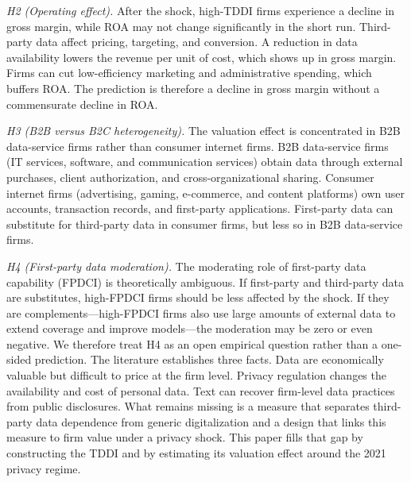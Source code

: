 \textit{H2 (Operating effect).} After the shock, high-TDDI firms experience a decline in gross margin, while ROA may not change significantly in the short run. Third-party data affect pricing, targeting, and conversion. A reduction in data availability lowers the revenue per unit of cost, which shows up in gross margin. Firms can cut low-efficiency marketing and administrative spending, which buffers ROA. The prediction is therefore a decline in gross margin without a commensurate decline in ROA.

\textit{H3 (B2B versus B2C heterogeneity).} The valuation effect is concentrated in B2B data-service firms rather than consumer internet firms. B2B data-service firms (IT services, software, and communication services) obtain data through external purchases, client authorization, and cross-organizational sharing. Consumer internet firms (advertising, gaming, e-commerce, and content platforms) own user accounts, transaction records, and first-party applications. First-party data can substitute for third-party data in consumer firms, but less so in B2B data-service firms.

\textit{H4 (First-party data moderation).} The moderating role of first-party data capability (FPDCI) is theoretically ambiguous. If first-party and third-party data are substitutes, high-FPDCI firms should be less affected by the shock. If they are complements—high-FPDCI firms also use large amounts of external data to extend coverage and improve models—the moderation may be zero or even negative. We therefore treat H4 as an open empirical question rather than a one-sided prediction.
The literature establishes three facts. Data are economically valuable but difficult to price at the firm level. Privacy regulation changes the availability and cost of personal data. Text can recover firm-level data practices from public disclosures. What remains missing is a measure that separates third-party data dependence from generic digitalization and a design that links this measure to firm value under a privacy shock. This paper fills that gap by constructing the TDDI and by estimating its valuation effect around the 2021 privacy regime.
